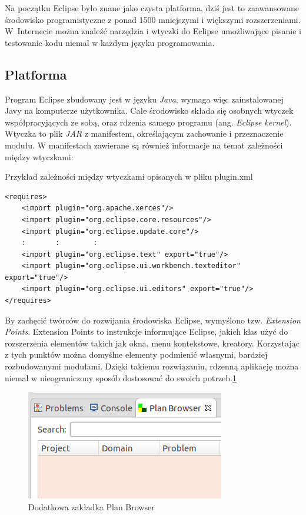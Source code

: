 Na początku Eclipse było znane jako czysta platforma, dziś jest to zaawansowane środowisko programistyczne z ponad 1500 mniejszymi i większymi rozszerzeniami. W~Internecie można znaleźć narzędzia i wtyczki do Eclipse umożliwające pisanie i testowanie kodu niemal w każdym języku programowania.

\subsection{Platforma}
\label{subsec:platforma}
Program Eclipse zbudowany jest w języku \emph{Java}, wymaga więc zainstalowanej Javy na komputerze użytkownika.  Całe środowisko składa się osobnych wtyczek współpracyjących ze sobą, oraz rdzenia samego programu (ang. \emph{Eclipse kernel}). Wtyczka to plik \emph{JAR} z manifestem, określającym zachowanie i przeznaczenie modułu. W manifestach zawierane są również informacje na temat zależności między wtyczkami:

Przykład zależności między wtyczkami opisanych w pliku plugin.xml
\begin{verbatim}
<requires>
	<import plugin="org.apache.xerces"/>
	<import plugin="org.eclipse.core.resources"/>
	<import plugin="org.eclipse.update.core"/>
	:       :        :
	<import plugin="org.eclipse.text" export="true"/>
	<import plugin="org.eclipse.ui.workbench.texteditor" export="true"/>
	<import plugin="org.eclipse.ui.editors" export="true"/>
</requires>
\end{verbatim}

By zachęcić twórców do rozwijania środowiska Eclipse, wymyślono tzw. \emph{Extension Points}. Extension Points to instrukcje informujące Eclipse, jakich klas użyć do rozszerzenia elementów takich jak okna, menu kontekstowe, kreatory. Korzystając z tych punktów można domyślne elementy podmienić własnymi, bardziej rozbudowanymi modułami. Dzięki takiemu rozwiązaniu, rdzenną aplikację można niemal w nieograniczony sposób dostosować do swoich potrzeb.\ref{ana_structure}

\begin{figure}[h]
  \centering
    \includegraphics{img/custom-window.png}
    \caption{Dodatkowa zakładka Plan Browser}
    \label{ana_structure}
\end{figure}

